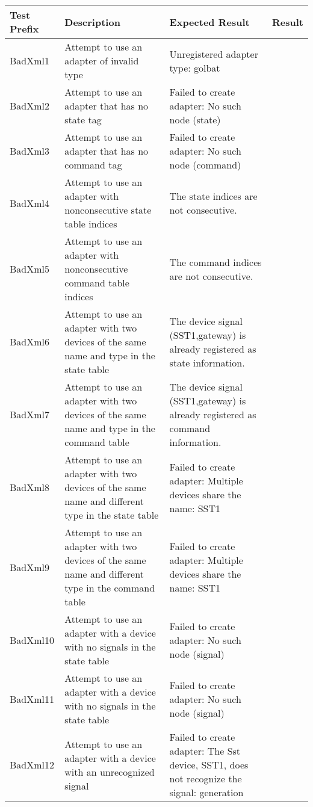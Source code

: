 \documentclass{article}
\begin{document}
%
\begin{center}
\begin{footnotesize}
\begin{longtable}{|p{3cm}|p{4cm}|p{10cm}|c|}
    \hline
    Test Prefix & Description & Expected Result & Result \\ \hline \endhead \hline \endfoot
    BadXml1 & Attempt to use an adapter of invalid type & Unregistered adapter type: golbat & \\
    BadXml2 & Attempt to use an adapter that has no state tag & Failed to create adapter: No such node (state) & \\
    BadXml3 & Attempt to use an adapter that has no command tag & Failed to create adapter: No such node (command) & \\
    BadXml4 & Attempt to use an adapter with nonconsecutive state table indices & The state indices are not consecutive. & \\
    BadXml5 & Attempt to use an adapter with nonconsecutive command table indices & The command indices are not consecutive. & \\
    BadXml6 & Attempt to use an adapter with two devices of the same name and type in the state table & The device signal (SST1,gateway) is already registered as state information. & \\
    BadXml7 & Attempt to use an adapter with two devices of the same name and type in the command table & The device signal (SST1,gateway) is already registered as command information. & \\
    BadXml8 & Attempt to use an adapter with two devices of the same name and different type in the state table & Failed to create adapter: Multiple devices share the name: SST1 & \\
    BadXml9 & Attempt to use an adapter with two devices of the same name and different type in the command table & Failed to create adapter: Multiple devices share the name: SST1 & \\
    BadXml10 & Attempt to use an adapter with a device with no signals in the state table & Failed to create adapter: No such node (signal) & \\
    BadXml11 & Attempt to use an adapter with a device with no signals in the state table & Failed to create adapter: No such node (signal) & \\
    BadXml12 & Attempt to use an adapter with a device with an unrecognized signal & Failed to create adapter: The Sst device, SST1, does not recognize the signal: generation & \\

\end{longtable}
\end{footnotesize}
\end{center}
\end{document}
